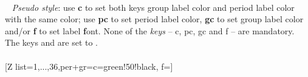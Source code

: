 \\ [0pt]\pgfPTendstyle%
\newpage\vspace{-34pt}\ %
\label{style_per+gr}%
%
{\textit{Pseudo style}: use \textbf{c} to set both keys group label color and period label color with the same color; use \textbf{pc} to set period label color, \textbf{gc} to set group label color and/or \textbf{f } to set label \textbf{f}ont. None of the \textit{keys} -- c, pc, gc and f -- are mandatory.
The keys  and  are set to .
\\ [3pt]%
}%
\\ [5pt][Z list={1,...,36},per+gr={c=green!50!black, f=\string{}\string\selectfont\string\normalsize\string\bfseries}]%
\\ [10pt]\makebox[\linewidth][c]{\scalebox{.6}{\pgfPT[Z list={1,...,36},per+gr={c=green!50!black,f=\fontfamily{frc}\selectfont\normalsize\bfseries}]}}%
\\ [0pt]\pgfPTendstyle%
\endinput
